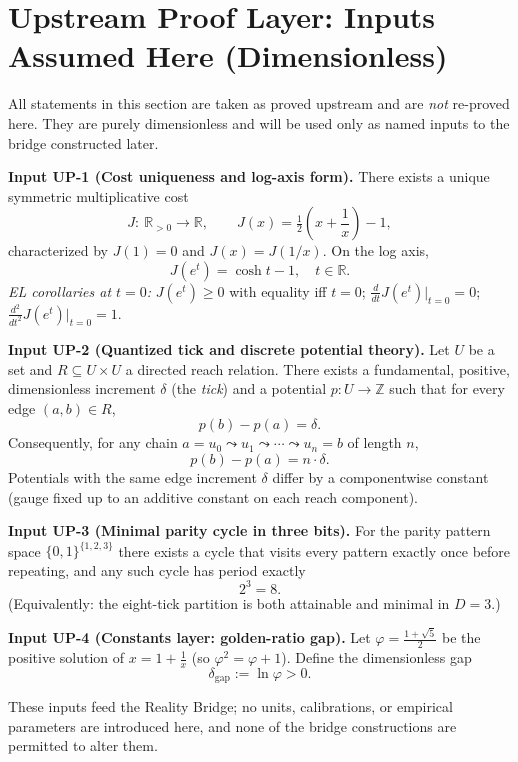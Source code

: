 \documentclass[11pt]{article}
\begin{document}
\section{Upstream Proof Layer: Inputs Assumed Here (Dimensionless)}
All statements in this section are taken as proved upstream and are \emph{not} re-proved here. They are purely dimensionless and will be used only as named inputs to the bridge constructed later.

\medskip
\noindent\textbf{Input UP-1 (Cost uniqueness and log-axis form).}
There exists a unique symmetric multiplicative cost
\[
J:\ \mathbb{R}_{>0}\to\mathbb{R},\qquad
J(x)=\tfrac12\!\left(x+\frac{1}{x}\right)-1,
\]
characterized by \(J(1)=0\) and \(J(x)=J(1/x)\). On the log axis,
\[
J(e^{t})=\cosh t-1,\quad t\in\mathbb{R}.
\]
\emph{EL corollaries at \(t=0\):} \(J(e^{t})\ge 0\) with equality iff \(t=0\); \(\frac{d}{dt}J(e^{t})\big|_{t=0}=0\); \(\frac{d^{2}}{dt^{2}}J(e^{t})\big|_{t=0}=1\).

\medskip
\noindent\textbf{Input UP-2 (Quantized tick and discrete potential theory).}
Let \(U\) be a set and \(R\subseteq U\times U\) a directed reach relation. There exists a fundamental, positive, dimensionless increment \(\delta\) (the \emph{tick}) and a potential \(p:U\to\mathbb{Z}\) such that for every edge \((a,b)\in R\),
\[
p(b)-p(a)=\delta.
\]
Consequently, for any chain \(a=u_{0}\leadsto u_{1}\leadsto\cdots\leadsto u_{n}=b\) of length \(n\),
\[
p(b)-p(a)=n\cdot\delta.
\]
Potentials with the same edge increment \(\delta\) differ by a componentwise constant (gauge fixed up to an additive constant on each reach component).

\medskip
\noindent\textbf{Input UP-3 (Minimal parity cycle in three bits).}
For the parity pattern space \(\{0,1\}^{\{1,2,3\}}\) there exists a cycle that visits every pattern exactly once before repeating, and any such cycle has period exactly
\[
2^{3}=8.
\]
(Equivalently: the eight-tick partition is both attainable and minimal in \(D=3\).)

\medskip
\noindent\textbf{Input UP-4 (Constants layer: golden-ratio gap).}
Let \(\varphi=\tfrac{1+\sqrt{5}}{2}\) be the positive solution of \(x=1+\tfrac{1}{x}\) (so \(\varphi^{2}=\varphi+1\)). Define the dimensionless gap
\[
\delta_{\mathrm{gap}}:=\ln\varphi>0.
\]

\medskip
\noindent These inputs feed the Reality Bridge; no units, calibrations, or empirical parameters are introduced here, and none of the bridge constructions are permitted to alter them.
\end{document}

